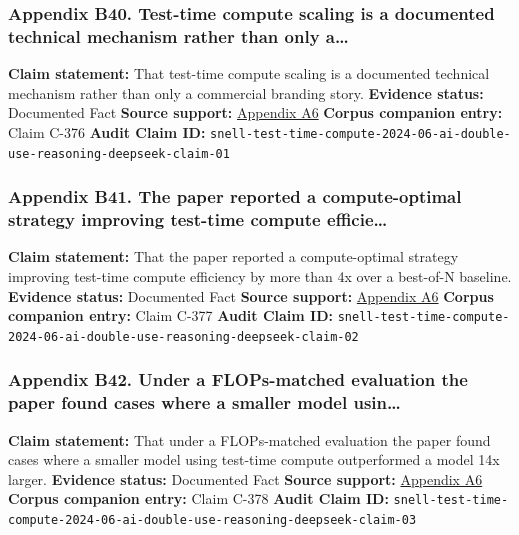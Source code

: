 \documentclass[
  american,
  11pt,
  letterpaper,
]{article}
\begin{document}
\subsubsection{Appendix B40. Test-time compute scaling is a documented
technical mechanism rather than only
a\ldots{}}\label{appendix-b40-test-time-compute-scaling-is-a-documented-technical-mechanism-rather-than-only-a}

\textbf{Claim statement:} That test-time compute scaling is a documented
technical mechanism rather than only a commercial branding story.
\textbf{Evidence status:} Documented Fact \textbf{Source support:}
\hyperref[appendix-a6-scaling-llm-test-time-compute-optimally-can-be-more-effective-than-scaling-model-parameters]{Appendix
A6} \textbf{Corpus companion entry:} Claim C-376 \textbf{Audit Claim
ID:}
\texttt{snell-test-time-compute-2024-06-ai-double-use-reasoning-deepseek-claim-01}

\subsubsection{Appendix B41. The paper reported a compute-optimal
strategy improving test-time compute
efficie\ldots{}}\label{appendix-b41-the-paper-reported-a-compute-optimal-strategy-improving-test-time-compute-efficie}

\textbf{Claim statement:} That the paper reported a compute-optimal
strategy improving test-time compute efficiency by more than 4x over a
best-of-N baseline. \textbf{Evidence status:} Documented Fact
\textbf{Source support:}
\hyperref[appendix-a6-scaling-llm-test-time-compute-optimally-can-be-more-effective-than-scaling-model-parameters]{Appendix
A6} \textbf{Corpus companion entry:} Claim C-377 \textbf{Audit Claim
ID:}
\texttt{snell-test-time-compute-2024-06-ai-double-use-reasoning-deepseek-claim-02}

\subsubsection{Appendix B42. Under a FLOPs-matched evaluation the paper
found cases where a smaller model
usin\ldots{}}\label{appendix-b42-under-a-flops-matched-evaluation-the-paper-found-cases-where-a-smaller-model-usin}

\textbf{Claim statement:} That under a FLOPs-matched evaluation the
paper found cases where a smaller model using test-time compute
outperformed a model 14x larger. \textbf{Evidence status:} Documented
Fact \textbf{Source support:}
\hyperref[appendix-a6-scaling-llm-test-time-compute-optimally-can-be-more-effective-than-scaling-model-parameters]{Appendix
A6} \textbf{Corpus companion entry:} Claim C-378 \textbf{Audit Claim
ID:}
\texttt{snell-test-time-compute-2024-06-ai-double-use-reasoning-deepseek-claim-03}
\end{document}
